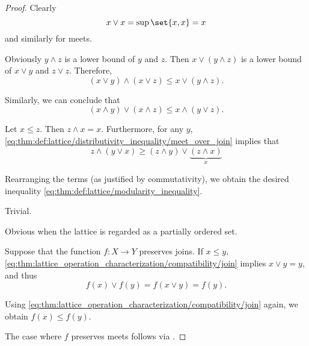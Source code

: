 \begin{proof}
   Clearly
  \begin{equation*}
    x \vee x = \sup\set{ x, x } = x
  \end{equation*}
  and similarly for meets.

   Obviously \( y \wedge z \) is a lower bound of \( y \) and \( z \). Then \( x \vee (y \wedge z) \) is a lower bound of \( x \vee y \) and \( z \vee z \). Therefore,
  \begin{equation*}
    (x \vee y) \wedge (x \vee z) \leq x \vee (y \wedge z).
  \end{equation*}

  Similarly, we can conclude that
  \begin{equation*}
    (x \wedge y) \vee (x \wedge z) \leq x \wedge (y \vee z).
  \end{equation*}

   Let \( x \leq z \). Then \( z \wedge x = x \). Furthermore, for any \( y \), \eqref{eq:thm:def:lattice/distributivity_inequality/meet_over_join} implies that
  \begin{equation*}
    z \wedge (y \vee x) \geq (z \wedge y) \vee \underbrace{(z \wedge x)}_{x}
  \end{equation*}

  Rearranging the terms (as justified by commutativity), we obtain the desired inequality \eqref{eq:thm:def:lattice/modularity_inequality}.

   Trivial.

   Obvious when the lattice is regarded as a partially ordered set.

   Suppose that the function \( f: X \to Y \) preserves joins. If \( x \leq y \), \eqref{eq:thm:lattice_operation_characterization/compatibility/join} implies \( x \vee y = y \), and thus
  \begin{equation*}
    f(x) \vee f(y) = f(x \vee y) = f(y).
  \end{equation*}

  Using \eqref{eq:thm:lattice_operation_characterization/compatibility/join} again, we obtain \( f(x) \leq f(y) \).

  The case where \( f \) preserves meets follows via .


\end{proof}
